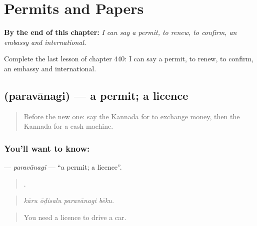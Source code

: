 
\chapter{Permits and Papers}
\label{ch:ka-permits-and-papers}

\begin{chapteropening}
\textbf{By the end of this chapter:} \emph{I can say a permit, to renew, to confirm, an embassy and international.}

Complete the last lesson of chapter 440: I can say a permit, to renew, to confirm, an embassy and international.
\end{chapteropening}

\section[\texorpdfstring{\kn{ಪರವಾನಗಿ} (paravānagi)}{ಪರವಾನಗಿ (paravānagi)}]{ (paravānagi) — a permit; a licence}

\label{lesson:KA-C440-paravanagi}



\begin{quote}
Before the new one: say the Kannada for to exchange money, then the Kannada for a cash machine.
\end{quote}

\subsection*{You'll want to know: }
\textbf{} — \emph{paravānagi} — \textquotedblleft{}a permit; a licence\textquotedblright{}.

\begin{quote}
   .
\end{quote}

\begin{quote}
\emph{kāru ōḍisalu paravānagi bēku.}
\end{quote}

\begin{quote}
You need a licence to drive a car.
\end{quote}

